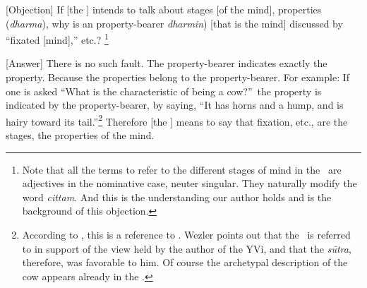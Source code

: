 [Objection]%
 If [the \Bhasyakara] intends to talk about stages [of the mind], properties (\emph{dharma}), why is an property-bearer \emph{dharmin}) [that is the mind] discussed by ``fixated [mind],'' etc.?%
  \footnote{Note that all the terms to refer to the different stages of mind in the \bhasya\ are adjectives in the nominative case, neuter singular.  They naturally modify the word \emph{cittam}.  And this is the understanding our author holds and is the background of this objection.%
  }

[Answer]%
 There is no such fault.  The property-bearer indicates exactly the property.  Because the properties belong to the property-bearer.  For
example: If one is asked ``What is the characteristic of being a
cow?''\ the property is indicated by the property-bearer, by saying, ``It has
horns and a hump, and is hairy toward its tail.''\footnote{According to
  \citet{wezler:yvi3}, this is a reference to .  Wezler
  points out that the \sutra\ is referred to in support of the
  view held by the author of the YVi, and that the \emph{sūtra}, therefore,
  was favorable to him.  Of course the archetypal description of the cow appears already in the \VMBh.} Therefore [the \Bhasyakara] means to say that fixation, etc., are the stages, the properties of the mind.

